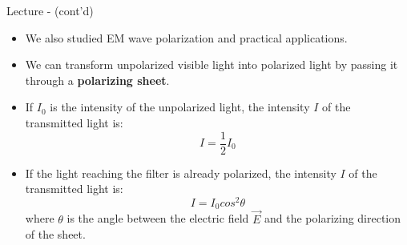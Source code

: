 \begin{frame}{Lecture \summarizedlecture - \lecturesummarytitle (cont'd)}

\begin{itemize}

\item We also studied EM wave polarization and practical applications.

\item
We can transform unpolarized visible light into polarized light by passing
it through a {\bf polarizing sheet}.\\

\item
If $I_0$ is the intensity of the unpolarized light,
the intensity $I$ of the transmitted light is:
\begin{equation*}
  I = \frac{1}{2}I_0
\end{equation*}

\item
If the light reaching the filter is already polarized,
the intensity $I$ of the transmitted light is:
\begin{equation*}
  I = I_0 cos^2\theta
\end{equation*}
where $\theta$ is the angle between the electric field $\vec{E}$
and the polarizing direction of the sheet.
\end{itemize}

\end{frame}

%
%
%

